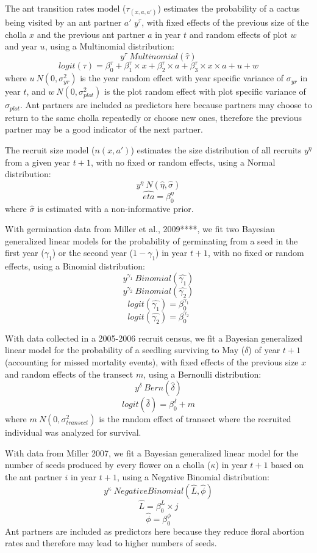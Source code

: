 \documentclass[11pt]{article}
\begin{document}
The ant transition rates model ($\tau_(x,a,a')$) estimates the probability of a cactus being visited by an ant partner $a'$ $y^{\tau}$, with fixed effects of the previous size of the cholla $x$  and the previous ant partner $a$  in year $t$ and random effects of plot $w$ and year $u$, using a Multinomial distribution: 
$$y^{\tau} ~ Multinomial(\hat{\tau})$$
$$logit(\tau) = \beta_{0}^{\tau} + \beta_{1}^{\tau} \times x + \beta_{2}^{\tau} \times a + \beta_{3}^{\tau} \times x \times a + u + w$$
where $u ~ N(0,\sigma_{yr}^{2})$ is the year random effect with year specific variance of $\sigma_{yr}$ in year $t$, and $w ~ N(0,\sigma_{plot}^{2})$ is the plot random effect with plot specific variance of $\sigma_{plot}$.
Ant partners are included as predictors here because partners may choose to return to the same cholla repeatedly or choose new ones, therefore the previous partner may be a good indicator of the next partner. 

The recruit size model ($n(x,a')$) estimates the size distribution of all recruits $y^{\eta}$ from a given year $t+1$, with no fixed or random effects, using a Normal distribution: 
$$y^{\eta} ~ N(\hat{\eta},\hat{\sigma})$$
$$\hat{eta} = \beta_{0}^{\eta}$$
where $\hat{\sigma}$ is estimated with a non-informative prior. 

With germination data from Miller et al., 2009****, we fit two Bayesian generalized linear models for the probability of germinating from a seed in the first year ($\gamma_1$) or the second year ($1 - \gamma_1$) in year $t+1$, with no fixed or random effects, using a Binomial distribution:
$$y^{\gamma_1} ~ Binomial(\hat{\gamma_1})$$
$$y^{\gamma_2} ~ Binomial(\hat{\gamma_2})$$
$$logit(\hat{\gamma_1}) = \beta_{0}^{\gamma_1}$$
$$logit(\hat{\gamma_2}) = \beta_{0}^{\gamma_2}$$

With data collected in a 2005-2006 recruit census, we fit a Bayesian generalized linear model for the probability of a seedling surviving to May ($\delta$) of year $t+1$ (accounting for missed mortality events), with fixed effects of the previous size $x$ and random effects of the transect $m$, using a Bernoulli distribution: 
$$y^{\delta} ~ Bern(\hat{\delta})$$
$$logit(\hat{\delta}) = \beta_{0}^{\delta} + m$$
 where $m ~ N(0, \sigma_{transect}^2)$ is the random effect of transect where the recruited individual was analyzed for survival.

With data from Miller 2007, we fit a Bayesian generalized linear model for the number of seeds produced by every flower on a cholla ($\kappa$) in year $t+1$ based on the ant partner $i$ in year $t+1$, using a Negative Binomial distribution:
$$y^{\kappa} ~ Negative Binomial(\hat{L},\hat{\phi})$$
$$\hat{L} = \beta_{0}^{L} \times j$$
$$\hat{\phi} = \beta_{0}^{\phi}$$
Ant partners are included as predictors here because they reduce floral abortion rates and therefore may lead to higher numbers of seeds. 
\end{document}
